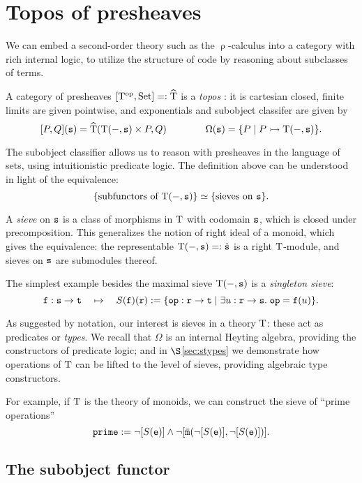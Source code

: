 \documentclass[stthol.tex]{subfiles}
\begin{document}
\section{Topos of presheaves}
\label{sec:topos}

We can embed a second-order theory such as the $\uprho$-calculus into a category with rich internal logic, to utilize the structure of code by reasoning about subclasses of terms.

A category of presheaves $[\mathrm{T}^{\mathrm{op}},\mathrm{Set}]=: \widehat{\mathrm{T}}$ is a \textit{topos} \cite{sheavesinGL}: it is cartesian closed, finite limits are given pointwise, and exponentials and subobject classifer are given by
$$[P,Q](\mathtt{s})= \widehat{\mathrm{T}}(\mathrm{T}(-,\mathtt{s})\times P,Q)\qquad\qquad \Omega(\mathtt{s})=\{P \; | \; P\rightarrowtail \mathrm{T}(-,\mathtt{s})\}.$$

The subobject classifier allows us to reason with presheaves in the language of sets, using intuitionistic predicate logic. The definition above can be understood in light of the equivalence:
$$\{\text{subfunctors of } \mathrm{T}(-,\mathtt{s})\} \simeq \{\text{sieves on } \mathtt{s}\}.$$

A \textit{sieve} on $\mathtt{s}$ is a class of morphisms in $\mathrm{T}$ with codomain $\mathtt{s}$, which is closed under precomposition. This generalizes the notion of right ideal of a monoid, which gives the equivalence: the representable $\mathrm{T}(-,\mathtt{s})=:\hat{\mathtt{s}}$ is a right $\mathrm{T}$-module, and sieves on $\mathtt{s}$ are submodules thereof.

The simplest example besides the maximal sieve $\mathrm{T}(-,\mathtt{s})$ is a \textit{singleton sieve}:
$$\mathtt{f}:\mathtt{s}\to \mathtt{t}\quad \mapsto\quad S(\mathtt{f})(\mathtt{r}):= \{\mathtt{op}:\mathtt{r}\to \mathtt{t}\; |\; \exists u:\mathtt{r}\to \mathtt{s}.\; \mathtt{op}=\mathtt{f}(u)\}.$$

As suggested by notation, our interest is sieves in a theory $\mathrm{T}$: these act as predicates or \textit{types}. We recall that $\Omega$ is an internal Heyting algebra, providing the constructors of predicate logic; and in $\S$\ref{sec:stypes} we demonstrate how operations of $\mathrm{T}$ can be lifted to the level of sieves, providing algebraic type constructors.

For example, if $\mathrm{T}$ is the theory of monoids, we can construct the sieve of ``prime operations''
$$\mtt{prime} := \neg[S(\e)]\land  \neg[\ob{\m}(\neg[S(\e)],\neg[S(\e)])].$$

\subsection{The subobject functor}
\label{ssec:sub}
\end{document}
